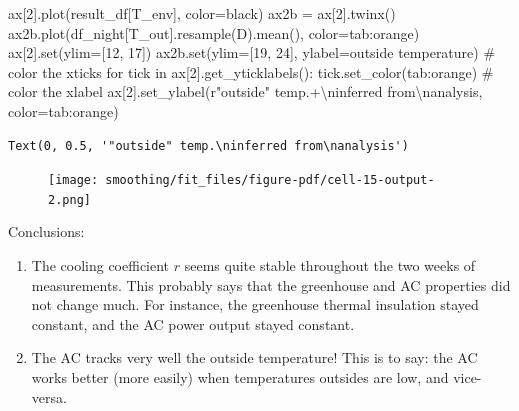 \documentclass[
  letterpaper,
  DIV=11,
  numbers=noendperiod,
  oneside]{scrreprt}
\newenvironment{Shaded}{\begin{snugshade}}{\end{snugshade}}
\newcommand{\BuiltInTok}[1]{\textcolor[rgb]{0.00,0.23,0.31}{#1}}
\newcommand{\CharTok}[1]{\textcolor[rgb]{0.13,0.47,0.30}{#1}}
\newcommand{\CommentTok}[1]{\textcolor[rgb]{0.37,0.37,0.37}{#1}}
\newcommand{\ControlFlowTok}[1]{\textcolor[rgb]{0.00,0.23,0.31}{#1}}
\newcommand{\DecValTok}[1]{\textcolor[rgb]{0.68,0.00,0.00}{#1}}
\newcommand{\KeywordTok}[1]{\textcolor[rgb]{0.00,0.23,0.31}{#1}}
\newcommand{\NormalTok}[1]{\textcolor[rgb]{0.00,0.23,0.31}{#1}}
\newcommand{\OperatorTok}[1]{\textcolor[rgb]{0.37,0.37,0.37}{#1}}
\newcommand{\StringTok}[1]{\textcolor[rgb]{0.13,0.47,0.30}{#1}}
\newcommand{\VerbatimStringTok}[1]{\textcolor[rgb]{0.13,0.47,0.30}{#1}}
\providecommand{\tightlist}{%
  \setlength{\itemsep}{0pt}\setlength{\parskip}{0pt}}\usepackage{longtable,booktabs,array}
\begin{document}
\begin{Shaded}
\begin{Highlighting}[]
\NormalTok{ax[}\DecValTok{2}\NormalTok{].plot(result\_df[}\StringTok{\textquotesingle{}T\_env\textquotesingle{}}\NormalTok{], color}\OperatorTok{=}\StringTok{\textquotesingle{}black\textquotesingle{}}\NormalTok{)}
\NormalTok{ax2b }\OperatorTok{=}\NormalTok{ ax[}\DecValTok{2}\NormalTok{].twinx()}
\NormalTok{ax2b.plot(df\_night[}\StringTok{\textquotesingle{}T\_out\textquotesingle{}}\NormalTok{].resample(}\StringTok{\textquotesingle{}D\textquotesingle{}}\NormalTok{).mean(), color}\OperatorTok{=}\StringTok{\textquotesingle{}tab:orange\textquotesingle{}}\NormalTok{)}
\NormalTok{ax[}\DecValTok{2}\NormalTok{].}\BuiltInTok{set}\NormalTok{(ylim}\OperatorTok{=}\NormalTok{[}\DecValTok{12}\NormalTok{, }\DecValTok{17}\NormalTok{])}
\NormalTok{ax2b.}\BuiltInTok{set}\NormalTok{(ylim}\OperatorTok{=}\NormalTok{[}\DecValTok{19}\NormalTok{, }\DecValTok{24}\NormalTok{],}
\NormalTok{        ylabel}\OperatorTok{=}\StringTok{\textquotesingle{}outside temperature\textquotesingle{}}\NormalTok{)}
\CommentTok{\# color the xticks}
\ControlFlowTok{for}\NormalTok{ tick }\KeywordTok{in}\NormalTok{ ax[}\DecValTok{2}\NormalTok{].get\_yticklabels():}
\NormalTok{    tick.set\_color(}\StringTok{\textquotesingle{}tab:orange\textquotesingle{}}\NormalTok{)}
\CommentTok{\# color the xlabel}
\NormalTok{ax[}\DecValTok{2}\NormalTok{].set\_ylabel(}\VerbatimStringTok{r\textquotesingle{}"outside" temp.\textquotesingle{}}\OperatorTok{+}\StringTok{\textquotesingle{}}\CharTok{\textbackslash{}n}\StringTok{inferred from}\CharTok{\textbackslash{}n}\StringTok{analysis\textquotesingle{}}\NormalTok{, color}\OperatorTok{=}\StringTok{\textquotesingle{}tab:orange\textquotesingle{}}\NormalTok{)}
\end{Highlighting}
\end{Shaded}

\begin{verbatim}
Text(0, 0.5, '"outside" temp.\ninferred from\nanalysis')
\end{verbatim}

\begin{figure}[H]

{\centering \texttt{[image: smoothing/fit\_files/figure-pdf/cell-15-output-2.png]}

}

\end{figure}

Conclusions:

\begin{enumerate}
\def\labelenumi{\arabic{enumi}.}
\tightlist
\item
  The cooling coefficient \(r\) seems quite stable throughout the two
  weeks of measurements. This probably says that the greenhouse and AC
  properties did not change much. For instance, the greenhouse thermal
  insulation stayed constant, and the AC power output stayed constant.
\item
  The AC tracks very well the outside temperature! This is to say: the
  AC works better (more easily) when temperatures outsides are low, and
  vice-versa.
\end{enumerate}
\end{document}
